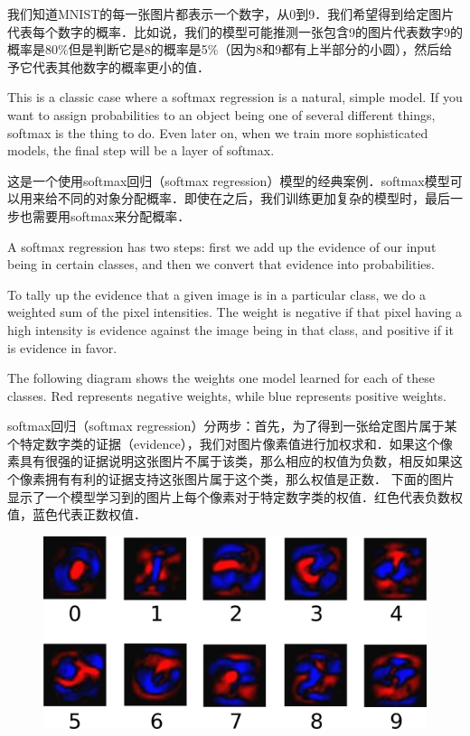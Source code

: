 我们知道MNIST的每一张图片都表示一个数字，从0到9．我们希望得到给定图片代表每个数字的概率．比如说，我们的模型可能推测一张包含9的图片代表数字9的概率是80\%但是判断它是8的概率是5\%（因为8和9都有上半部分的小圆），然后给予它代表其他数字的概率更小的值．

This is a classic case where a softmax regression is a natural, simple model. If you want to assign probabilities to an object being one of several different things, softmax is the thing to do. Even later on, when we train more sophisticated models, the final step will be a layer of softmax.

这是一个使用softmax回归（softmax regression）模型的经典案例．softmax模型可以用来给不同的对象分配概率．即使在之后，我们训练更加复杂的模型时，最后一步也需要用softmax来分配概率．

A softmax regression has two steps: first we add up the evidence of our input being in certain classes, and then we convert that evidence into probabilities.

To tally up the evidence that a given image is in a particular class, we do a weighted sum of the pixel intensities. The weight is negative if that pixel having a high intensity is evidence against the image being in that class, and positive if it is evidence in favor.

The following diagram shows the weights one model learned for each of these classes. Red represents negative weights, while blue represents positive weights.

softmax回归（softmax regression）分两步：首先，为了得到一张给定图片属于某个特定数字类的证据（evidence），我们对图片像素值进行加权求和．如果这个像素具有很强的证据说明这张图片不属于该类，那么相应的权值为负数，相反如果这个像素拥有有利的证据支持这张图片属于这个类，那么权值是正数．
下面的图片显示了一个模型学习到的图片上每个像素对于特定数字类的权值．红色代表负数权值，蓝色代表正数权值．

\begin{figure}[htbp]
\centering
\includegraphics[width=.65\textwidth]{../SOURCE/images/softmax-weights.png}
\caption{}
\end{figure}


